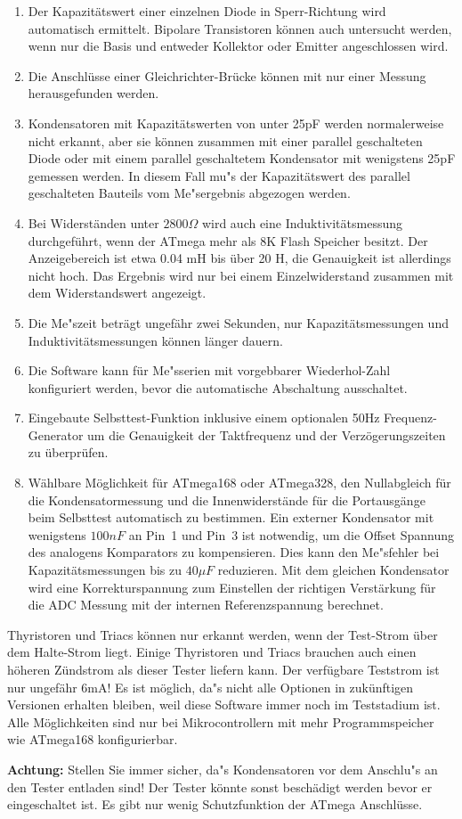 \begin{enumerate}
\item Der Kapazit\"atswert einer einzelnen Diode in Sperr-Richtung wird automatisch ermittelt.
Bipolare Transistoren k\"onnen auch untersucht werden, wenn nur die Basis und entweder Kollektor oder Emitter angeschlossen wird.
\item Die Anschl\"usse einer Gleichrichter-Br\"ucke k\"onnen mit nur einer Messung herausgefunden werden.
\item Kondensatoren mit Kapazit\"atswerten von unter 25pF werden normalerweise nicht erkannt, 
aber sie k\"onnen zusammen mit einer parallel geschalteten Diode oder mit einem parallel geschaltetem Kondensator mit
wenigstens 25pF gemessen werden.
In diesem Fall mu"s der Kapazit\"atswert des parallel geschalteten Bauteils vom Me"sergebnis abgezogen werden.
\item Bei Widerst\"anden unter \(2800 \Omega\) wird auch eine Induktivit\"atsmessung durchgef\"uhrt, wenn der
ATmega mehr als 8K Flash Speicher besitzt.
Der Anzeigebereich ist etwa 0.04 mH bis \"uber 20 H, die Genauigkeit ist allerdings nicht hoch.
Das Ergebnis wird nur bei einem Einzelwiderstand zusammen mit dem Widerstandswert angezeigt.
\item Die Me"szeit betr\"agt ungef\"ahr zwei Sekunden, nur Kapazit\"atsmessungen und Induktivit\"atsmessungen k\"onnen l\"anger dauern.
\item Die Software kann f\"ur Me"sserien mit vorgebbarer Wiederhol-Zahl konfiguriert werden, bevor die automatische Abschaltung ausschaltet.
\item Eingebaute Selbsttest-Funktion inklusive einem optionalen 50Hz Frequenz-Generator um die Genauigkeit der Taktfrequenz
und der Verz\"ogerungszeiten zu \"uberpr\"ufen.
\item W\"ahlbare M\"oglichkeit f\"ur ATmega168 oder ATmega328, den Nullabgleich f\"ur die Kondensatormessung und die Innenwiderst\"ande f\"ur die
Portausg\"ange beim Selbsttest automatisch zu bestimmen.
Ein externer Kondensator mit wenigstens \(100 nF\) an Pin~1 und Pin~3 ist notwendig, um die Offset Spannung des analogens
Komparators zu kompensieren.
Dies kann den Me"sfehler bei Kapazit\"atsmessungen bis zu \(40 \mu F\) reduzieren.
Mit dem gleichen Kondensator wird eine Korrekturspannung zum Einstellen der richtigen Verst\"arkung f\"ur
die ADC Messung mit der internen Referenzspannung berechnet.
\end{enumerate}

Thyristoren und Triacs k\"onnen nur erkannt werden, wenn der Test-Strom \"uber dem Halte-Strom liegt.
Einige Thyristoren und Triacs brauchen auch einen h\"oheren Z\"undstrom als dieser Tester liefern kann.
Der verf\"ugbare Teststrom ist nur ungef\"ahr 6mA!
Es ist m\"oglich, da"s nicht alle Optionen in zuk\"unftigen Versionen erhalten bleiben, weil diese Software
immer noch im Teststadium ist.
Alle M\"oglichkeiten sind nur bei Mikrocontrollern mit mehr Programmspeicher wie ATmega168 konfigurierbar.

\vspace{1cm}
\textbf{{\Large Achtung:}} Stellen Sie immer sicher, da"s Kondensatoren vor dem Anschlu"s an den Tester entladen sind!
Der Tester k\"onnte sonst besch\"adigt werden bevor er eingeschaltet ist.
Es gibt nur wenig Schutzfunktion der ATmega Anschl\"usse.


